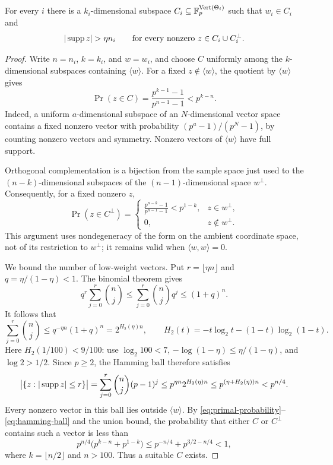 \begin{lemma}
\label{lem:codes}
For every \(i\) there is a \(k_i\)-dimensional subspace
\(C_i\subseteq\mathbb F_p^{\operatorname{Vert}(\Theta_i)}\) such that \(w_i\in C_i\)
and
\[
  |\supp z|>\eta n_i
  \qquad
  \text{for every nonzero }z\in C_i\cup C_i^\perp.
\]
\end{lemma}

\begin{proof}
Write \(n=n_i\), \(k=k_i\), and \(w=w_i\), and choose \(C\) uniformly among
the \(k\)-dimensional subspaces containing \(\langle w\rangle\).
For a fixed \(z\notin\langle w\rangle\), the quotient by
\(\langle w\rangle\) gives
\begin{equation}
\label{eq:primal-probability}
  \Pr(z\in C)
  =\frac{p^{k-1}-1}{p^{n-1}-1}
  <p^{k-n}.
\end{equation}
Indeed, a uniform \(a\)-dimensional subspace of an \(N\)-dimensional
vector space contains a fixed nonzero vector with probability
\((p^a-1)/(p^N-1)\), by counting nonzero vectors and symmetry.
Nonzero vectors of \(\langle w\rangle\) have full support.

Orthogonal complementation is a bijection from the sample space just
used to the \((n-k)\)-dimensional subspaces of the \((n-1)\)-dimensional
space \(w^\perp\).  Consequently, for a fixed nonzero \(z\),
\begin{equation}
\label{eq:dual-probability}
  \Pr(z\in C^\perp)=
  \begin{cases}
    \displaystyle\frac{p^{n-k}-1}{p^{n-1}-1}<p^{1-k},
       &z\in w^\perp,\\[6pt]
    0,&z\notin w^\perp.
  \end{cases}
\end{equation}
This argument uses nondegeneracy of the form on the ambient coordinate
space, not of its restriction to \(w^\perp\); it remains valid when
\(\langle w,w\rangle=0\).

We bound the number of low-weight vectors.  Put \(r=\lfloor\eta n\rfloor\)
and \(q=\eta/(1-\eta)<1\).  The binomial theorem gives
\[
  q^r\sum_{j=0}^r\binom nj
  \le \sum_{j=0}^r\binom nj q^j
  \le (1+q)^n.
\]
It follows that
\[
  \sum_{j=0}^r\binom nj
  \le q^{-\eta n}(1+q)^n
  =2^{H_2(\eta)n},
  \qquad
  H_2(t)=-t\log_2t-(1-t)\log_2(1-t).
\]
Here \(H_2(1/100)<9/100\): use \(\log_2 100<7\),
\(-\log(1-\eta)\le\eta/(1-\eta)\), and \(\log2>1/2\).
Since \(p\ge2\), the Hamming ball therefore satisfies
\begin{equation}
\label{eq:hamming-ball}
  \bigl|\{z:|\operatorname{supp} z|\le r\}\bigr|
  =\sum_{j=0}^r\binom nj(p-1)^j
  \le p^{\eta n}2^{H_2(\eta)n}
  \le p^{(\eta+H_2(\eta))n}
  <p^{n/4}.
\end{equation}
Every nonzero vector in this ball lies outside \(\langle w\rangle\).
By \eqref{eq:primal-probability}--\eqref{eq:hamming-ball} and the union
bound, the probability that either \(C\) or \(C^\perp\) contains such a
vector is less than
\[
  p^{n/4}\bigl(p^{k-n}+p^{1-k}\bigr)
  \le p^{-n/4}+p^{3/2-n/4}<1,
\]
where \(k=\lfloor n/2\rfloor\) and \(n>100\).
Thus a suitable \(C\) exists.
\end{proof}

